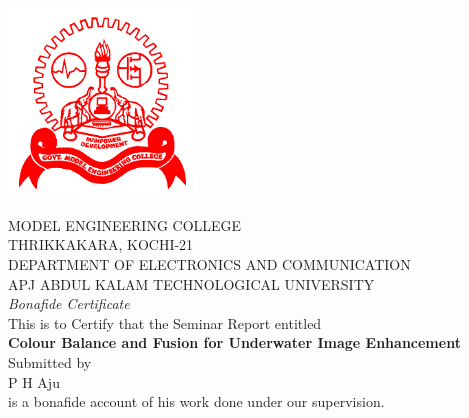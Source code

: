 \documentclass[hidelinks, 12pt]{report}
\begin{document}
\centering
\section*{}
\vspace{1cm}
\includegraphics[height=5cm,width=5cm]{logo}

\begin{center}
MODEL ENGINEERING COLLEGE\\
\vspace{0.5cm}
THRIKKAKARA, KOCHI-21\\
\vspace{0.5cm}
DEPARTMENT OF ELECTRONICS AND COMMUNICATION \\
\vspace{0.5cm}
APJ ABDUL KALAM TECHNOLOGICAL UNIVERSITY \\
\vspace{1cm}
\textit{Bonafide Certificate}
\\This is to Certify that the Seminar Report entitled\\
\vspace{0.5cm}
\textbf{Colour Balance and Fusion for Underwater Image Enhancement} 
\\
\vspace{0.5cm}
Submitted by\\
\vspace{0.2cm}
P H Aju\\
\vspace{0.2cm}
is a bonafide account of his work done under our supervision. \\
\end{center}
\end{document}
